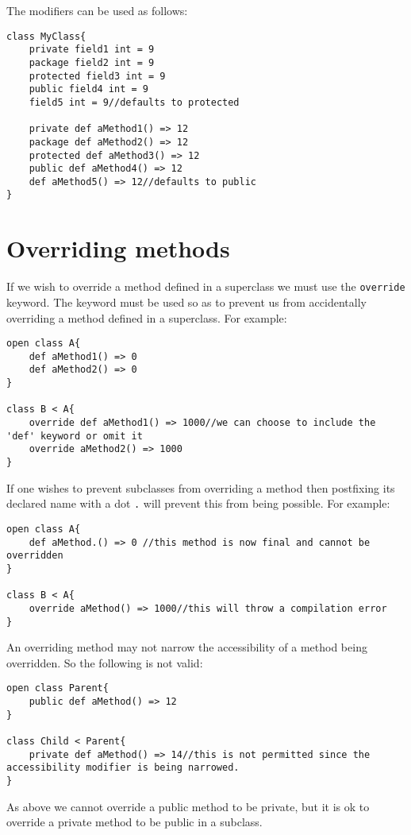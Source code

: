 \documentclass[conc-doc]{subfiles}
\begin{document}
The modifiers can be used as follows:
\begin{lstlisting}
class MyClass{
	private field1 int = 9
	package field2 int = 9
	protected field3 int = 9
	public field4 int = 9
	field5 int = 9//defaults to protected
	
	private def aMethod1() => 12
	package def aMethod2() => 12
	protected def aMethod3() => 12
	public def aMethod4() => 12
	def aMethod5() => 12//defaults to public
}
\end{lstlisting}

\section{Overriding methods}
If we wish to override a method defined in a superclass we must use the \lstinline{override} keyword. The keyword must be used so as to prevent us from accidentally overriding a method defined in a superclass. For example:

\begin{lstlisting}
open class A{
	def aMethod1() => 0
	def aMethod2() => 0
}

class B < A{
	override def aMethod1() => 1000//we can choose to include the 'def' keyword or omit it
	override aMethod2() => 1000
}
\end{lstlisting}

If one wishes to prevent subclasses from overriding a method then postfixing its declared name with a dot \lstinline{.} will prevent this from being possible. For example:

\begin{lstlisting}
open class A{
	def aMethod.() => 0 //this method is now final and cannot be overridden
}

class B < A{
	override aMethod() => 1000//this will throw a compilation error
}
\end{lstlisting}

An overriding method may not narrow the accessibility of a method being overridden. So the following is not valid:

\begin{lstlisting}
open class Parent{
	public def aMethod() => 12
}

class Child < Parent{
	private def aMethod() => 14//this is not permitted since the accessibility modifier is being narrowed.
}
\end{lstlisting}

As above we cannot override a public method to be private, but it is ok to override a private method to be public in a subclass.
\end{document}
